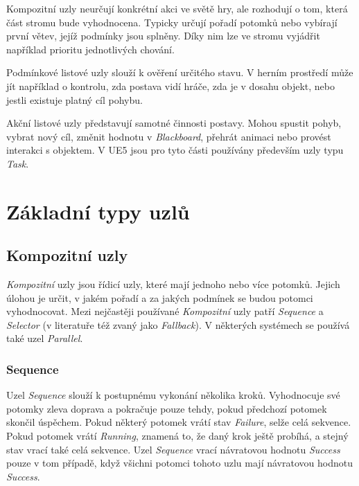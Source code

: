 Kompozitní uzly neurčují konkrétní akci ve světě hry, ale rozhodují o tom, která část stromu bude vyhodnocena. 
Typicky určují pořadí potomků nebo vybírají první větev, jejíž podmínky jsou splněny. 
Díky nim lze ve stromu vyjádřit například prioritu jednotlivých chování.

Podmínkové listové uzly slouží k ověření určitého stavu. 
V herním prostředí může jít například o kontrolu, zda postava vidí hráče, zda je v dosahu objekt, nebo jestli existuje platný cíl pohybu. 

Akční listové uzly představují samotné činnosti postavy. 
Mohou spustit pohyb, vybrat nový cíl, změnit hodnotu v \textit{Blackboard}, přehrát animaci nebo provést interakci s objektem. 
V UE5 jsou pro tyto části používány především uzly typu \textit{Task}.\cite[s.~76]{butler2023}

\section{Základní typy uzlů}
\label{sec:behavior_tree_node_types}

\subsection{Kompozitní uzly}

\textit{Kompozitní} uzly jsou řídicí uzly, které mají jednoho nebo více potomků. 
Jejich úlohou je určit, v jakém pořadí a za jakých podmínek se budou potomci vyhodnocovat. 
Mezi nejčastěji používané \textit{Kompozitní} uzly patří \textit{Sequence} a \textit{Selector} (v literatuře též zvaný jako \textit{Fallback}). 
V některých systémech se používá také uzel \textit{Parallel}.\cite[s.~6--7]{colledanchise2018}

\subsubsection{Sequence}

Uzel \textit{Sequence} slouží k postupnému vykonání několika kroků. 
Vyhodnocuje své potomky zleva doprava a pokračuje pouze tehdy, pokud předchozí potomek skončil úspěchem. 
Pokud některý potomek vrátí stav \textit{Failure}, selže celá sekvence. 
Pokud potomek vrátí \textit{Running}, znamená to, že daný krok ještě probíhá, a stejný stav vrací také celá sekvence.
Uzel \textit{Sequence} vrací návratovou hodnotu \textit{Success} pouze v tom případě, když všichni potomci tohoto uzlu mají návratovou hodnotu \textit{Success}.~\cite[s.~6]{colledanchise2018}

